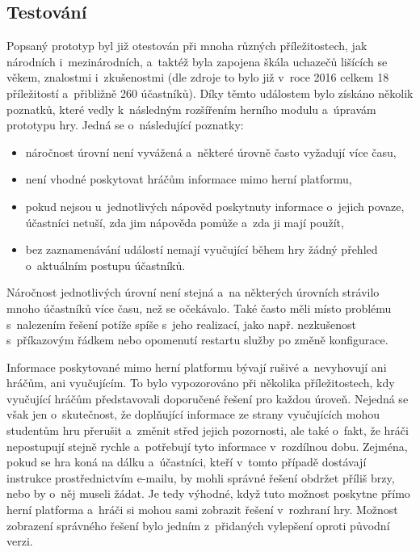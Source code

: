 \documentclass[
  digital, %
  oneside, %
  table,   %
  nolof,     %
  nolot,     %
  nocover
]{fithesis3}
\begin{document}
\subsection{Testování} \label{gameTesting}
Popsaný prototyp byl již otestován při mnoha různých příležitostech, jak národních i~mezinárodních, a~taktéž byla zapojena škála uchazečů lišících se věkem, znalostmi i~zkušenostmi (dle zdroje \cite{ctfDesign} to bylo již v~roce 2016 celkem 18 příležitostí a~přibližně 260 účastníků).
Díky těmto událostem bylo získáno několik poznatků, které vedly k~následným rozšířením herního modulu a~úpravám prototypu hry. Jedná se o~následující poznatky:
\begin{itemize}
  \item náročnost úrovní není vyvážená a~některé úrovně často vyžadují více času,
  \item není vhodné poskytovat hráčům informace mimo herní platformu,
  \item pokud nejsou u~jednotlivých nápověd poskytnuty informace o~jejich povaze, účastníci netuší, zda jim nápověda pomůže a~zda ji mají použít,
  \item bez zaznamenávání událostí nemají vyučující během hry žádný přehled o~aktuálním postupu účastníků.
\end{itemize}
Náročnost jednotlivých úrovní není stejná a~na některých úrovních strávilo mnoho účastníků více času, než se očekávalo. Také často měli místo problému s~nalezením řešení potíže spíše s~jeho realizací, jako např. nezkušenost s~příkazovým řádkem nebo opomenutí restartu služby po změně konfigurace.\par
Informace poskytované mimo herní platformu bývají rušivé a~nevyhovují ani hráčům, ani vyučujícím. To bylo vypozorováno při několika příležitostech, kdy vyučující hráčům představovali doporučené řešení pro každou úroveň. Nejedná se však jen o~skutečnost, že doplňující informace ze strany vyučujících mohou studentům hru přerušit a~změnit střed jejich pozornosti, ale také o~fakt, že hráči nepostupují stejně rychle a~potřebují tyto informace v~rozdílnou dobu. Zejména, pokud se hra koná na dálku a~účastníci, kteří v~tomto případě dostávají instrukce prostřednictvím e-mailu, by mohli správné řešení obdržet příliš brzy, nebo by o~něj museli žádat. Je tedy výhodné, když tuto možnost poskytne přímo herní platforma a~hráči si mohou sami zobrazit řešení v~rozhraní hry. Možnost zobrazení správného řešení bylo jedním z~přidaných vylepšení oproti původní verzi.\par
\end{document}
